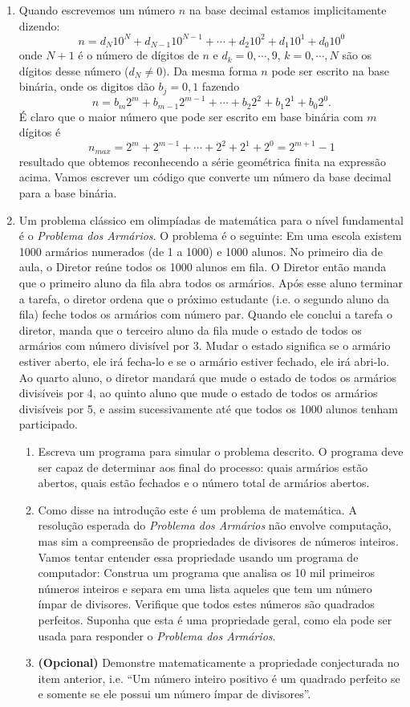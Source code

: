 \begin{enumerate}
    \item  Quando escrevemos um número $n$ na base decimal estamos implicitamente dizendo:
\[ n = d_N 10^N + d_{N-1} 10^{N-1} + \cdots + d_2 10^2 + d_1 10^1 + d_0 10^0 \]
onde $N+1$ é o número de dígitos de $n$ e $d_k = 0,\cdots,9$, $k=0,\cdots,N$ são os dígitos desse número ($d_N \neq 0)$. Da mesma forma $n$ pode ser escrito na base binária, onde os digitos dão $b_j = 0,1 $ fazendo
\[ n = b_m 2^m + b_{m-1} 2^{m-1}+ \cdots + b_2 2^2 + b_1 2^1 + b_0 2^0. \]
É claro que o maior número que pode ser escrito em base binária com $m$ dígitos é
\[ n_{max} = 2^m + 2^{m-1}+ \cdots + 2^2 + 2^1 +  2^0 = 2^{m+1}-1 \]
resultado que obtemos reconhecendo a série geométrica finita na expressão acima. Vamos escrever um código que converte um número da base decimal para a base binária.
    \item Um problema clássico em olimpíadas de matemática para o nível fundamental é o {\it Problema dos Armários}. O problema é o seguinte: Em uma escola existem 1000 armários numerados (de 1 a 1000) e 1000 alunos. No primeiro dia de aula, o Diretor reúne todos os 1000 alunos em fila. O Diretor então manda que o primeiro aluno da fila abra todos os armários. Após esse aluno terminar a tarefa, o diretor ordena que o próximo estudante (i.e. o segundo aluno da fila) feche todos os armários com número par. Quando ele conclui a tarefa o diretor, manda que o terceiro aluno da fila mude o estado de todos os armários com número divisível por 3. Mudar o estado significa se o armário estiver aberto, ele irá fecha-lo e se o armário estiver fechado, ele irá abri-lo. Ao quarto aluno, o diretor mandará que mude o estado de todos os armários divisíveis por 4, ao quinto aluno que mude o estado de todos os armários divisíveis por 5, e assim sucessivamente até que todos os 1000 alunos tenham participado.
    \begin{enumerate}
        \item Escreva um programa para simular o problema descrito. O programa deve ser capaz de determinar aos final do processo: quais armários estão abertos, quais estão fechados e o número total de armários abertos.
        \item Como disse na introdução este é um problema de matemática. A resolução esperada do {\it Problema dos Armários} não envolve computação, mas sim a compreensão de propriedades de divisores de números inteiros. Vamos tentar entender essa propriedade usando um programa de computador: Construa um programa que analisa os 10 mil primeiros números inteiros e separa em uma lista aqueles que tem um número ímpar de divisores. Verifique que todos estes números são quadrados perfeitos. Suponha que esta é uma propriedade geral, como ela pode ser usada para responder o {\it Problema dos Armários}.
        \item {\bf (Opcional)} Demonstre matematicamente a propriedade conjecturada no item anterior, i.e.  ``Um número inteiro positivo é um quadrado perfeito se e somente se ele possui um número ímpar de divisores''.
    \end{enumerate}
\end{enumerate}

